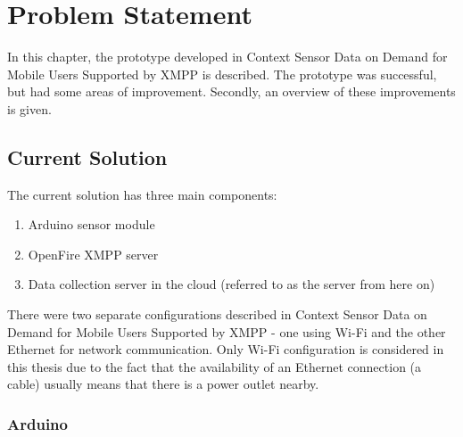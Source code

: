 
\chapter{Problem Statement} %


\ifpdf
    \graphicspath{{X/figures/PNG/}{X/figures/PDF/}{X/figures/}}
\else
    \graphicspath{{X/figures/EPS/}{X/figures/}}
\fi


In this chapter, the prototype developed in Context Sensor Data on Demand
for Mobile Users Supported by XMPP \cite{prev_thesis} is described. The prototype was successful, but had some areas of improvement. Secondly, an overview of these improvements is given. 

\section{Current Solution}

The current solution \cite{prev_thesis} has three main components:
\begin{enumerate}
\item Arduino sensor module
\item OpenFire XMPP server
\item Data collection server in the cloud (referred to as the server from here on)
\end{enumerate}

There were two separate configurations described in Context Sensor Data on Demand
for Mobile Users Supported by XMPP - one using Wi-Fi and the other Ethernet for network communication. Only Wi-Fi configuration is considered in this thesis due to the fact that the availability of an Ethernet connection (a cable) usually means that there is a power outlet nearby. 

\subsection{Arduino}

